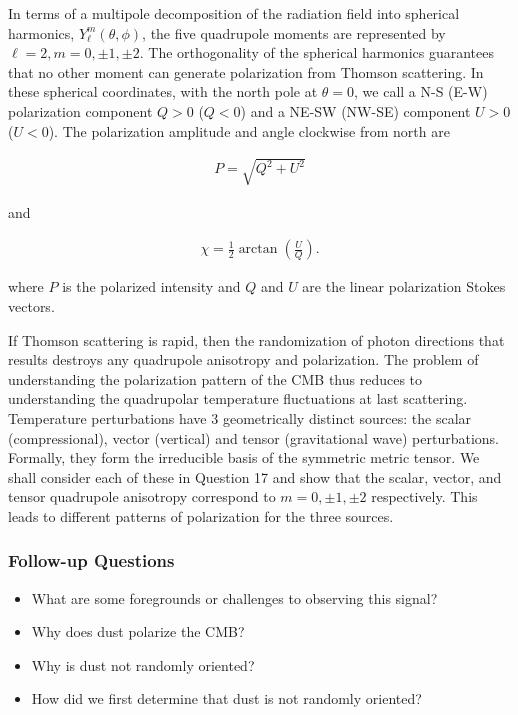 \documentclass[a4paper,11pt]{article}
\begin{document}
{\noindent}In terms of a multipole decomposition of the radiation field into spherical harmonics, $Y_\ell^m(\theta,\phi)$, the five quadrupole moments are represented by $\ell= 2, m=0,\pm1,\pm2$. The orthogonality of the spherical harmonics guarantees that no other moment can generate polarization from Thomson scattering. In these spherical coordinates, with the north pole at $\theta=0$, we call a N-S (E-W) polarization component $Q>0$ ($Q<0$) and a NE-SW (NW-SE) component $U>0$ ($U<0$). The polarization amplitude and angle clockwise from north are

\begin{align*}
    P = \sqrt{Q^2+U^2}
\end{align*}

{\noindent}and

\begin{align*}
    \chi = \frac{1}{2}\arctan\left(\frac{U}{Q}\right).
\end{align*}

{\noindent}where $P$ is the polarized intensity and $Q$ and $U$ are the linear polarization Stokes vectors.

{\noindent}If Thomson scattering is rapid, then the randomization of photon directions that results destroys any quadrupole anisotropy and polarization. The problem of understanding the polarization pattern of the CMB thus reduces to understanding the quadrupolar temperature fluctuations at last scattering. Temperature perturbations have 3 geometrically distinct sources: the scalar (compressional), vector (vertical) and tensor (gravitational wave) perturbations. Formally, they form the irreducible basis of the symmetric metric tensor. We shall consider each of these in Question 17 and show that the scalar, vector, and tensor quadrupole anisotropy correspond to $m=0,\pm1,\pm2$ respectively. This leads to different patterns of polarization for the three sources.

\subsubsection{Follow-up Questions}

\begin{itemize}
    \item What are some foregrounds or challenges to observing this signal?
    \item Why does dust polarize the CMB?
    \item Why is dust not randomly oriented?
    \item How did we first determine that dust is not randomly oriented?
\end{itemize}
\end{document}
